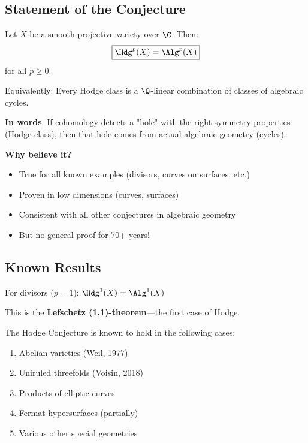 \subsection{Statement of the Conjecture}

\begin{conjecture}\label{conj:hodge}
Let $X$ be a smooth projective variety over $\C$. Then:
\begin{equation}
\boxed{\Hdg^p(X) = \Alg^p(X)}
\end{equation}
for all $p \geq 0$.

Equivalently: Every Hodge class is a $\Q$-linear combination of classes of algebraic cycles.
\end{conjecture}

\begin{intuitive}
\textbf{In words}: If cohomology detects a "hole" with the right symmetry properties (Hodge class), then that hole comes from actual algebraic geometry (cycles).

\textbf{Why believe it?}
\begin{itemize}
\item True for all known examples (divisors, curves on surfaces, etc.)
\item Proven in low dimensions (curves, surfaces)
\item Consistent with all other conjectures in algebraic geometry
\item But no general proof for 70+ years!
\end{itemize}
\end{intuitive}

\subsection{Known Results}

\begin{theorem}[Lefschetz (1924)]\label{thm:lefschetz}
For divisors ($p = 1$): $\Hdg^1(X) = \Alg^1(X)$

This is the \textbf{Lefschetz (1,1)-theorem}—the first case of Hodge.
\end{theorem}

\begin{theorem}\label{thm:known-cases}
The Hodge Conjecture is known to hold in the following cases:
\begin{enumerate}
\item Abelian varieties (Weil, 1977)
\item Uniruled threefolds (Voisin, 2018)
\item Products of elliptic curves
\item Fermat hypersurfaces (partially)
\item Various other special geometries
\end{enumerate}
\end{theorem}

